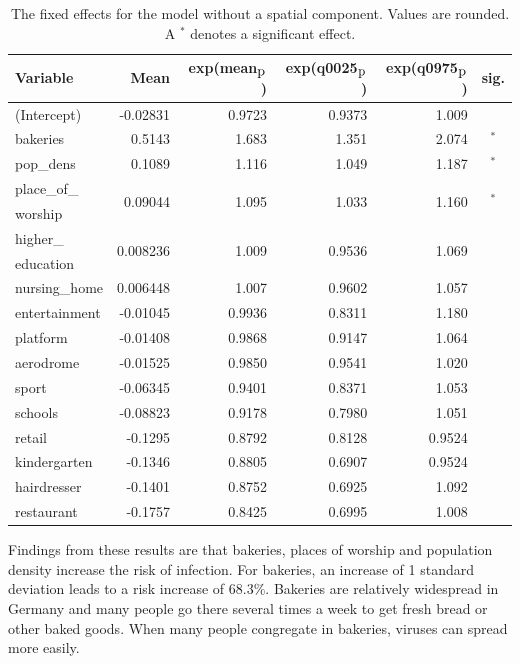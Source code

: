 \begin{table}[H] 
\caption{The fixed effects for the model without a spatial component. Values are rounded. A $^*$ denotes a significant effect.\label{fixedInfraGermany}}
\begin{tabular}{l r r r r c}
\toprule
\textbf{Variable}	& \textbf{Mean}	& \textbf{exp(mean$_{\hbox{p}}$)} & \textbf{exp(q0025$_{\hbox{p}}$)} & \textbf{exp(q0975$_{\hbox{p}}$)} & \textbf{sig.}\\
\midrule
(Intercept) & -0.02831 & 0.9723 & 0.9373 & 1.009 &\\
bakeries & 0.5143 & 1.683 & 1.351 & 2.074 &$^*$\\
pop\_dens & 0.1089 & 1.116 & 1.049 & 1.187 & $^*$\\
place\_of\_ & \multirow{2}{*}{0.09044} & \multirow{2}{*}{1.095} & \multirow{2}{*}{1.033} & \multirow{2}{*}{1.160} &\multirow{2}{*}{$^*$}\\
worship &  \\
higher\_ & \multirow{2}{*}{0.008236} & \multirow{2}{*}{1.009} & \multirow{2}{*}{0.9536} & \multirow{2}{*}{1.069} &\\
education \\
nursing\_home & 0.006448 & 1.007 & 0.9602 & 1.057 &\\
entertainment & -0.01045 & 0.9936 & 0.8311 & 1.180 &\\
platform & -0.01408 & 0.9868 & 0.9147 & 1.064 &\\
aerodrome & -0.01525 & 0.9850 & 0.9541 & 1.020 &\\
sport & -0.06345 & 0.9401 & 0.8371 & 1.053 \\
schools & -0.08823 & 0.9178 & 0.7980 & 1.051 &\\
retail & -0.1295 & 0.8792 & 0.8128 & 0.9524 &\\
kindergarten & -0.1346 & 0.8805 & 0.6907 & 0.9524 &\\
hairdresser & -0.1401 & 0.8752 & 0.6925 & 1.092 &\\
restaurant & -0.1757 & 0.8425 & 0.6995 & 1.008 &\\
\bottomrule
\end{tabular}
\end{table}
Findings from these results are that bakeries, places of worship and population density increase the risk of infection. For bakeries, an increase of 1 standard deviation leads to a risk increase of 68.3\%. Bakeries are relatively widespread in Germany and many people go there several times a week to get fresh bread or other baked goods. When many people congregate in bakeries, viruses can spread more easily. \\
